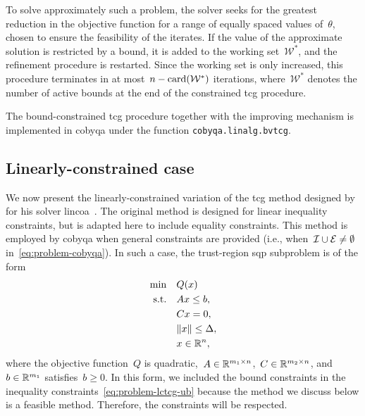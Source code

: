 To solve approximately such a problem, the solver seeks for the greatest reduction in the objective function for a range of equally spaced values of~$\theta$, chosen to ensure the feasibility of the iterates.
If the value of the approximate solution is restricted by a bound, it is added to the working set~$\mathcal{W}^{\ast}$, and the refinement procedure is restarted.
Since the working set is only increased, this procedure terminates in at most~$n - \operatorname{card}(\mathcal{W}^{\ast})$ iterations, where~$\mathcal{W}^{\ast}$ denotes the number of active bounds at the end of the constrained \gls{tcg} procedure.

The bound-constrained \gls{tcg} procedure together with the improving mechanism is implemented in \gls{cobyqa} under the function \texttt{cobyqa.linalg.bvtcg}.

\subsection{Linearly-constrained case}
\label{subsec:lctcg}

We now present the linearly-constrained variation of the \gls{tcg} method designed by \citeauthor{Powell_2015} for his solver \gls{lincoa}~\cite{Powell_2015}.
The original method is designed for linear inequality constraints, but is adapted here to include equality constraints.
This method is employed by \gls{cobyqa} when general constraints are provided (i.e., when~$\mathcal{I} \cup \mathcal{E} \neq \emptyset$ in~\cref{eq:problem-cobyqa}).
In such a case, the trust-region \gls{sqp} subproblem is of the form
\begin{subequations}
    \label{eq:problem-lctcg}
    \begin{align}
        \min        & \quad Q(\iter)\\
        \text{s.t.} & \quad A \iter \le b, \label{eq:problem-lctcg-ub}\\
                    & \quad C \iter = 0,\\
                    & \quad \norm{\iter} \le \rad,\\
                    & \quad \iter \in \R^n, \nonumber
    \end{align}
\end{subequations}
where the objective function~$Q$ is quadratic,~$A \in \mathbb{R}^{m_1 \times n}$,~$C \in \mathbb{R}^{m_2 \times n}$, and~$b \in \mathbb{R}^{m_1}$ satisfies~$b \ge 0$.
In this form, we included the bound constraints in the inequality constraints~\cref{eq:problem-lctcg-ub} because the method we discuss below is a feasible method.
Therefore, the constraints will be respected.

